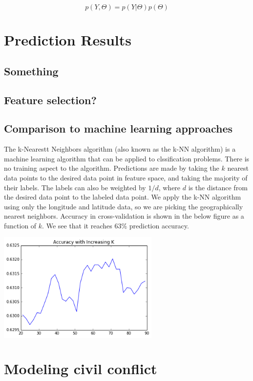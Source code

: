 \documentclass{article} %
\begin{document}
\begin{equation*}
p(Y,\Theta)=p(Y|\Theta)p(\Theta)
\end{equation*}

\section{Prediction Results}

\subsection{Something}
\subsection{Feature selection?}
\subsection{Comparison to machine learning approaches}

The k-Nearestt Neighbors algorithm (also known as the k-NN algorithm) is a machine learning algorithm that can be applied to clssification problems. There is no training aspect to the algorithm. Predictions are made by taking the $k$ nearest data points to the desired data point in feature space, and taking the majority of their labels. The labels can also be weighted by $1/d$, where $d$ is the distance from the desired data point to the labeled data point. We apply the k-NN algorithm using only the longitude and latitude data, so we are picking the geographically nearest neighbors. Accuracy in cross-validation is shown in the below figure as a function of $k$. We see that it reaches 63\% prediction accuracy.

\includegraphics[width=8cm]{figures/kNN_accuracy_vs_K.png}

\section{Modeling civil conflict}
\end{document}
